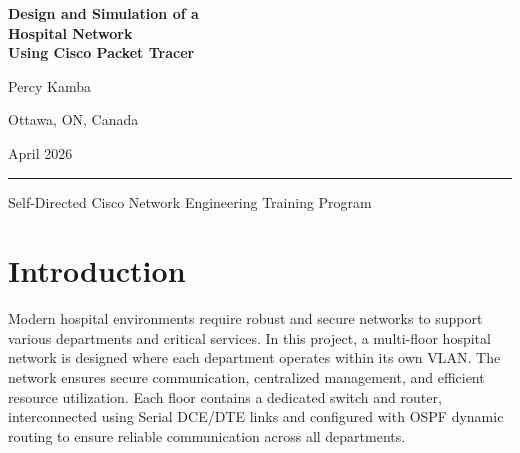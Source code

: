 \documentclass[12pt, a4paper]{article}
\begin{document}
\begin{titlepage}
    \centering
    \vspace*{2cm}
    
    {\Huge\bfseries\color{black}
    Design and Simulation of a\\
    Hospital Network\\
    \vspace{0.3cm}
    Using Cisco Packet Tracer}
    
    \vspace{1.5cm}
    
    {\large Percy Kamba}
    
    \vspace{0.5cm}
    
    {\normalsize Ottawa, ON, Canada}
    
    \vspace{0.5cm}
    
    {\normalsize April 2026}
    
    \vspace{2cm}
    
    \rule{0.8\textwidth}{0.5pt}
    
    \vspace{1cm}
    
    {\small Self-Directed Cisco Network Engineering Training Program}
    
\end{titlepage}

\begin{abstract}
This project presents the design and simulation of a complete enterprise hospital 
network distributed across three floors using Cisco Packet Tracer. Each department 
is segmented using VLAN technology to ensure security and efficient traffic management. 
The network integrates inter-VLAN routing, OSPF dynamic routing, DHCP services, 
and SSH secure access. The objective is to build a scalable, secure, and efficient 
network infrastructure for a multi-department hospital environment.
\end{abstract}

\tableofcontents
\newpage

\section{Introduction}

Modern hospital environments require robust and secure networks to support various 
departments and critical services. In this project, a multi-floor hospital network 
is designed where each department operates within its own VLAN. The network ensures 
secure communication, centralized management, and efficient resource utilization. 
Each floor contains a dedicated switch and router, interconnected using Serial 
DCE/DTE links and configured with OSPF dynamic routing to ensure reliable 
communication across all departments.
\end{document}
